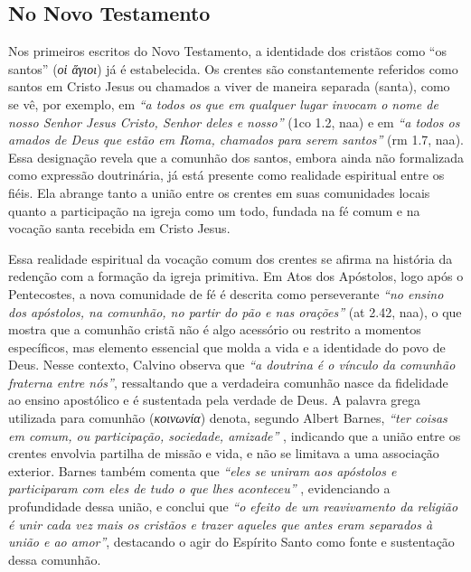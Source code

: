 \subsection{No Novo Testamento}

Nos primeiros escritos do Novo Testamento, a identidade dos cristãos como ``os santos'' (\textit{οἱ ἅγιοι}) já é estabelecida. Os crentes são constantemente referidos como santos em Cristo Jesus ou chamados a viver de maneira separada (santa), como se vê, por exemplo, em \textit{``a todos os que em qualquer lugar invocam o nome de nosso Senhor Jesus Cristo, Senhor deles e nosso''} (\gls{1co} 1.2, \gls{naa}) e em \textit{``a todos os amados de Deus que estão em Roma, chamados para serem santos''} (\gls{rm} 1.7, \gls{naa}). Essa designação revela que a comunhão dos santos, embora ainda não formalizada como expressão doutrinária, já está presente como realidade espiritual entre os fiéis. Ela abrange tanto a união entre os crentes em suas comunidades locais quanto a participação na igreja como um todo, fundada na fé comum e na vocação santa recebida em Cristo Jesus.

Essa realidade espiritual da vocação comum dos crentes se afirma na história da redenção com a formação da igreja primitiva. Em Atos dos Apóstolos, logo após o Pentecostes, a nova comunidade de fé é descrita como perseverante \textit{``no ensino dos apóstolos, na comunhão, no partir do pão e nas orações''} (\gls{at} 2.42, \gls{naa}), o que mostra que a comunhão cristã não é algo acessório ou restrito a momentos específicos, mas elemento essencial que molda a vida e a identidade do povo de Deus. Nesse contexto, Calvino observa que \textit{``a doutrina é o vínculo da comunhão fraterna entre nós''}\cite{calvinoAtos2}, ressaltando que a verdadeira comunhão nasce da fidelidade ao ensino apostólico e é sustentada pela verdade de Deus. A palavra grega utilizada para comunhão (\textit{κοινωνία}) denota, segundo Albert Barnes, \textit{``ter coisas em comum, ou participação, sociedade, amizade''} \cite{barnesAtos2}, indicando que a união entre os crentes envolvia partilha de missão e vida, e não se limitava a uma associação exterior. Barnes também comenta que \textit{``eles se uniram aos apóstolos e participaram com eles de tudo o que lhes aconteceu''} \cite{barnesAtos2}, evidenciando a profundidade dessa união, e conclui que \textit{``o efeito de um reavivamento da religião é unir cada vez mais os cristãos e trazer aqueles que antes eram separados à união e ao amor''}\cite{barnesAtos2}, destacando o agir do Espírito Santo como fonte e sustentação dessa comunhão.


